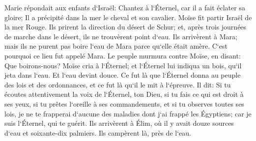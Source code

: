 \verse Marie répondait aux enfants d`Israël: Chantez à l`Éternel, car il a fait éclater sa gloire; Il a précipité dans la mer le cheval et son cavalier. 
\verse Moïse fit partir Israël de la mer Rouge. Ils prirent la direction du désert de Schur; et, après trois journées de marche dans le désert, ils ne trouvèrent point d`eau. 
\verse Ils arrivèrent à Mara; mais ils ne purent pas boire l`eau de Mara parce qu`elle était amère. C`est pourquoi ce lieu fut appelé Mara. 
\verse Le peuple murmura contre Moïse, en disant: Que boirons-nous? 
\verse Moïse cria à l`Éternel; et l`Éternel lui indiqua un bois, qu`il jeta dans l`eau. Et l`eau devint douce. Ce fut là que l`Éternel donna au peuple des lois et des ordonnances, et ce fut là qu`il le mit à l`épreuve. 
\verse Il dit: Si tu écoutes attentivement la voix de l`Éternel, ton Dieu, si tu fais ce qui est droit à ses yeux, si tu prêtes l`oreille à ses commandements, et si tu observes toutes ses lois, je ne te frapperai d`aucune des maladies dont j`ai frappé les Égyptiens; car je suis l`Éternel, qui te guérit. 
\verse Ils arrivèrent à Élim, où il y avait douze sources d`eau et soixante-dix palmiers. Ils campèrent là, près de l`eau. 

\chapter{}

